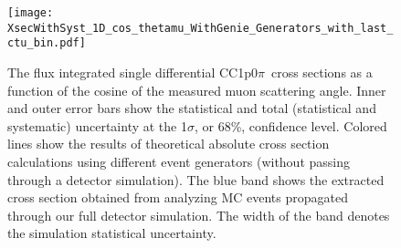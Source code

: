 \documentclass[aps,prl,showpacs,twocolumn,superscriptaddress,letterpaper,longbibliography]{revtex4-1}
\newcommand{\CCIpOpi}{CC1p0$\pi$}
\begin{document}





\begin{figure}[t]
	\centering  
        \texttt{[image: XsecWithSyst\_1D\_cos\_thetamu\_WithGenie\_Generators\_with\_last\_ctu\_bin.pdf]}\\
	\caption{The flux integrated single differential \CCIpOpi\ cross sections as a function of the cosine of the measured muon scattering angle.
	Inner and outer error bars show the statistical and total (statistical and systematic) uncertainty at the 1$\sigma$, or 68\%, confidence level. Colored lines show the results of 
	theoretical absolute cross section calculations using different event generators (without passing through a detector simulation). 
	The blue band shows the extracted cross section obtained 
	from analyzing MC events propagated through our full detector simulation. The width of the band denotes the simulation statistical uncertainty.}
	\label{fig:Xsec_1D}
\end{figure}
\end{document}
